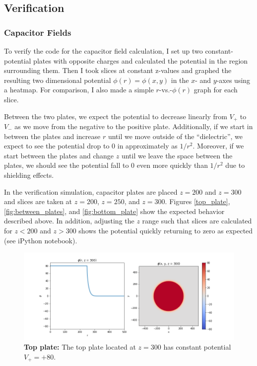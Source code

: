 \documentclass[twocolumn,aps,prl]{revtex4-1} %
\begin{document}
\subsection{Verification}

\subsubsection{Capacitor Fields}
To verify the code for the capacitor field calculation, I set up two constant-potential plates with opposite charges and calculated the potential in the region surrounding them.  Then I took slices at constant z-values and graphed the resulting two dimensional potential $\phi(r)=\phi(x,y)$ in the $x$- and $y$-axes using a heatmap.  For comparison, I also made a simple $r$-vs.-$\phi(r)$ graph for each slice.

Between the two plates, we expect the potential to decrease linearly from $V_{+}$ to $V_{-}$ as we move from the negative to the positive plate.  Additionally, if we start in between the plates and increase $r$ until we move outside of the ``dielectric'', we expect to see the potential drop to 0 in approximately as $1/r^2$.  Moreover, if we start between the plates and change $z$ until we leave the space between the plates, we should see the potential fall to 0 even more quickly than $1/r^2$ due to shielding effects.

In the verification simulation, capacitor plates are placed $z=200$ and $z=300$ and slices are taken at $z=200$, $z=250$, and $z=300$.  Figures \ref{top_plate}, \ref{fig:between_plates}, and \ref{fig:bottom_plate} show the expected behavior described above.  In addition, adjusting the $z$ range such that slices are calculated for $z<200$ and $z>300$ shows the potential quickly returning to zero as expected (see iPython notebook).

\begin{figure}
	\centering    
    \includegraphics[scale=0.52]{top_plate.png}
    \caption{\textbf{Top plate:} The top plate located at $z=300$ has constant potential $V_+ = +80$. }
    \label{fig:top_plate}
\end{figure}
\end{document}
